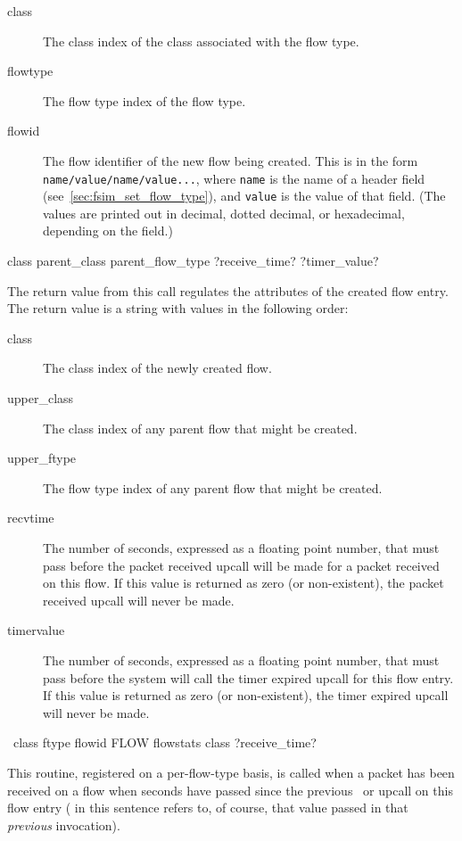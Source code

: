 \documentclass{article}
\begin{document}
\begin{description}
\item[class] The class index of the class associated with the flow type.
\item[flowtype] The flow type index of the flow type.
\item[flowid] The flow identifier of the new flow being created.  This
is in the form \texttt{name/value/name/value...}, where \texttt{name}
is the name of a header field (see~\ref{sec:fsim_set_flow_type}),
and \texttt{value} is the value of that field.  (The values are printed
out in decimal, dotted decimal, or hexadecimal, depending on the
field.)
\end{description}

\RETURNVALUES class parent\_class parent\_flow\_type ?receive\_time?
?timer\_value?

\RETURNDESC
The return value from this call regulates the attributes of the created
flow entry.  The return value is a string with values in the following
order:

\begin{description}
\item[class] The class index of the newly created flow.
\item[upper\_class] The class index of any parent flow that might be created.
\item[upper\_ftype] The flow type index of any parent flow that might be
created.
\item[recvtime] The number of seconds, expressed as a floating point
number, that must pass before the packet received upcall will be made
for a packet received on this flow.  If this value is returned as zero
(or non-existent), the packet received upcall will never be made.
\item[timervalue] The number of seconds, expressed as a floating point
number, that must pass before the system will call the timer expired
upcall for this flow entry.  If this value is returned as zero
(or non-existent), the timer expired upcall will never be made.
\end{description}

\manend

\label{sec:upcall_packet_reception}

\SYNOPSIS \cmdname\ class ftype flowid FLOW flowstats
\RETURNVALUES class ?receive\_time?

\DESCRIPTION

This routine, registered on a per-flow-type basis, is called when a
packet has been received on a flow when  seconds
have passed since the previous \cmdname\ or
 upcall on this flow entry
( in this sentence refers to, of course, that
value passed in that \emph{previous} invocation).
\end{document}
